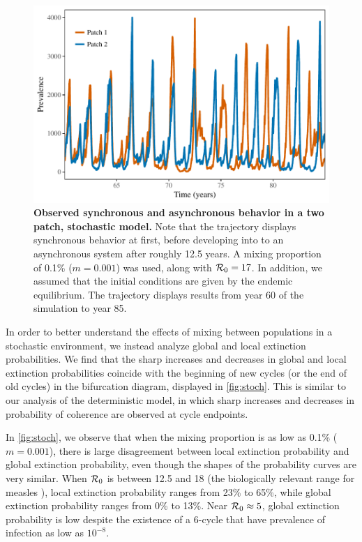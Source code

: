 \documentclass[12pt]{article}
\newcommand{\R}{{\cal R}}
\begin{document}
\begin{figure}[h]
    \centering
    \includegraphics[width=\textwidth]{supplementary/stochastic_illustrate.pdf}
    \caption{\textbf{Observed synchronous and asynchronous behavior in a two patch, stochastic model.} Note that the trajectory displays synchronous behavior at first, before developing into to an asynchronous system after roughly 12.5 years. A mixing proportion of 0.1\% ($m = 0.001$) was used, along with $\R_0 = 17$. In addition, we assumed that the initial conditions are given by the endemic equilibrium. The trajectory displays results from year 60 of the simulation to year 85.}
    \label{fig:stoch1_shift}
\end{figure}

In order to better understand the effects of mixing between populations in a stochastic environment, we instead analyze global and local extinction probabilities. 
We find that the sharp increases and decreases in global and local extinction probabilities coincide with the beginning of new cycles (or the end of old cycles) in the bifurcation diagram, displayed in \autoref{fig:stoch}. 
This is similar to our analysis of the deterministic model, in which sharp increases and decreases in probability of coherence are observed at cycle endpoints.

In \autoref{fig:stoch}, we observe that when the mixing proportion is as low as 0.1\% ($m = 0.001$), there is large disagreement between local extinction probability and global extinction probability, even though the shapes of the probability curves are very similar. 
When $\R_0$ is between 12.5 and 18 (the biologically relevant range for measles \cite{anderson1982directly}), local extinction probability ranges from 23\% to 65\%, while global extinction probability ranges from 0\% to 13\%. 
Near $\R_0 \approx 5$, global extinction probability is low despite the existence of a 6-cycle that have prevalence of infection as low as $10^{-8}$.
\end{document}
